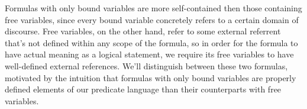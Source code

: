 \documentclass{article}
\begin{document}
Formulas with only bound variables are more self-contained then those containing free variables, since every bound variable concretely refers to a certain domain of discourse. Free variables, on the other hand, refer to some external referrent that's not defined within any scope of the formula, so in order for the formula to have actual meaning as a logical statement, we require its free variables to have well-defined external references. We'll distinguish between these two formulas, motivated by the intuition that formulas with only bound variables are properly defined elements of our predicate language than their counterparts with free variables.
\end{document}
